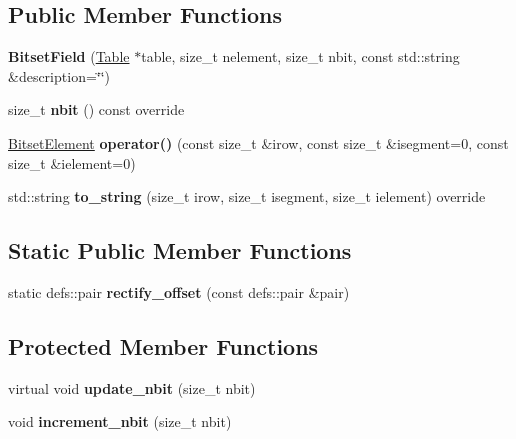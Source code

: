 \subsection*{Public Member Functions}
\begin{DoxyCompactItemize}
\item 
{\bfseries Bitset\+Field} (\hyperlink{classTable}{Table} $\ast$table, size\+\_\+t nelement, size\+\_\+t nbit, const std\+::string \&description=\char`\"{}\char`\"{})\hypertarget{classBitsetField_a63cb4af7c310f66d13eaa3e406083bab}{}\label{classBitsetField_a63cb4af7c310f66d13eaa3e406083bab}

\item 
size\+\_\+t {\bfseries nbit} () const override\hypertarget{classBitsetField_a8e791b6dcc0a47a33eb8f6f0f2a242c9}{}\label{classBitsetField_a8e791b6dcc0a47a33eb8f6f0f2a242c9}

\item 
\hyperlink{classBitsetElement}{Bitset\+Element} {\bfseries operator()} (const size\+\_\+t \&irow, const size\+\_\+t \&isegment=0, const size\+\_\+t \&ielement=0)\hypertarget{classBitsetField_aafbbb0286abfdfae29e12a74bc9d17a7}{}\label{classBitsetField_aafbbb0286abfdfae29e12a74bc9d17a7}

\item 
std\+::string {\bfseries to\+\_\+string} (size\+\_\+t irow, size\+\_\+t isegment, size\+\_\+t ielement) override\hypertarget{classBitsetField_a74210dfe93e12911b41fa22d328555a0}{}\label{classBitsetField_a74210dfe93e12911b41fa22d328555a0}

\end{DoxyCompactItemize}
\subsection*{Static Public Member Functions}
\begin{DoxyCompactItemize}
\item 
static defs\+::pair {\bfseries rectify\+\_\+offset} (const defs\+::pair \&pair)\hypertarget{classBitsetField_a2ed3cd55b88444348643ae5fdd6bb2b4}{}\label{classBitsetField_a2ed3cd55b88444348643ae5fdd6bb2b4}

\end{DoxyCompactItemize}
\subsection*{Protected Member Functions}
\begin{DoxyCompactItemize}
\item 
virtual void {\bfseries update\+\_\+nbit} (size\+\_\+t nbit)\hypertarget{classBitsetField_ad8fadd64db86e4df4566d07633a0f2d0}{}\label{classBitsetField_ad8fadd64db86e4df4566d07633a0f2d0}

\item 
void {\bfseries increment\+\_\+nbit} (size\+\_\+t nbit)\hypertarget{classBitsetField_a42665f70a291b36fbd68f119094b1768}{}\label{classBitsetField_a42665f70a291b36fbd68f119094b1768}

\end{DoxyCompactItemize}
